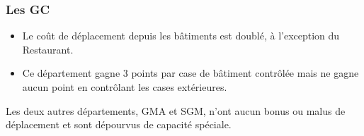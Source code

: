 \subsubsection{Les GC}
\begin{itemize}
\item Le coût de déplacement depuis les bâtiments est doublé, à l'exception du Restaurant. 
\item Ce département gagne 3 points par case de bâtiment contrôlée mais ne gagne aucun point en contrôlant les cases extérieures. 
\end{itemize}

\bigskip
Les deux autres départements, GMA et SGM, n'ont aucun bonus ou malus de déplacement et sont dépourvus de capacité spéciale.
